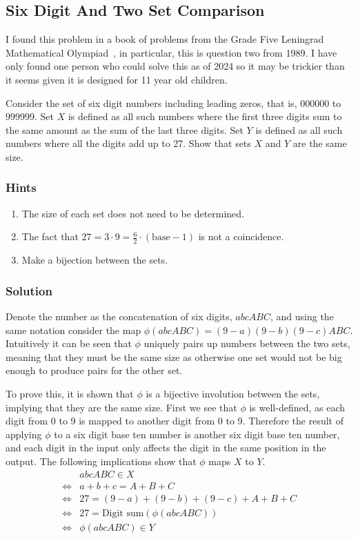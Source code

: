 
\subsection{Six Digit And Two Set Comparison}

I found this problem in a book of problems from the Grade Five Leningrad Mathematical Olympiad~\cite{Grade5LeningradOlympiad}, in particular, this is question two from 1989. I have only found one person who could solve this as of 2024 so it may be trickier than it seems given it is designed for 11 year old children.

Consider the set of six digit numbers including leading zeros, that is, 000000 to 999999. Set $X$ is defined as all such numbers where the first three digits sum to the same amount as the sum of the last three digits. Set $Y$ is defined as all such numbers where all the digits add up to 27. Show that sets $X$ and $Y$ are the same size.

\subsubsection{Hints}

\begin{enumerate}
    \item The size of each set does not need to be determined.
    \item The fact that $27 = 3 \cdot 9 = \frac{6}{2} \cdot (\text{base} - 1)$ is not a coincidence.
    \item Make a bijection between the sets.
\end{enumerate}

\subsubsection{Solution}

Denote the number as the concatenation of six digits, $abcABC$, and using the same notation consider the map $\phi(abcABC) = (9 - a)(9 - b)(9 - c)ABC$. Intuitively it can be seen that $\phi$ uniquely pairs up numbers between the two sets, meaning that they must be the same size as otherwise one set would not be big enough to produce pairs for the other set.

To prove this, it is shown that $\phi$ is a bijective involution between the sets, implying that they are the same size. First we see that $\phi$ is well-defined, as each digit from 0 to 9 is mapped to another digit from 0 to 9. Therefore the result of applying $\phi$ to a six digit base ten number is another six digit base ten number, and each digit in the input only affects the digit in the same position in the output. The following implications show that $\phi$ maps $X$ to $Y$.
\begin{align*}
    & abcABC \in X  \\
    \iff & a + b + c = A + B + C  \\
    \iff & 27 = (9 - a) + (9 - b) + (9 - c) + A + B + C  \\
    \iff & 27 = \text{Digit sum}(\phi(abcABC))  \\
    \iff & \phi(abcABC) \in Y
\end{align*}

